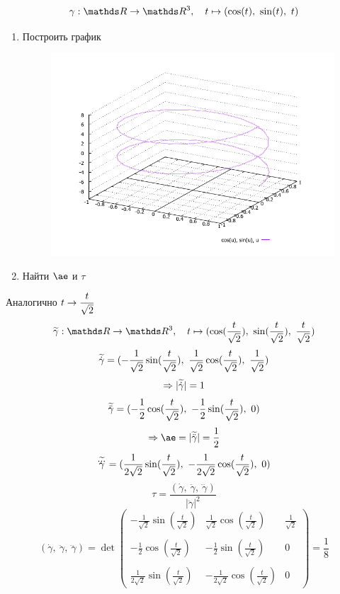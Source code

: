 \documentclass[12pt, fleqn]{article}
\begin{document}
\begin{Example}
  \[\gamma: \R \ra \R^3,\q t \mapsto (\cos(t),\ \sin(t),\ t)\]
  \begin{enumerate}
    \item Построить график
    \begin{figure}[H]
  	    \includegraphics[scale=0.6]{pics/2_3.png}
  	    \centering
  	\end{figure}
    \item Найти $\ae$ и $\tau$
  \end{enumerate}
\end{Example}

\begin{sol}
    Аналогично $t \rightarrow \dfrac{t}{\sqrt{2}}$
    \[\w{\gamma}: \R \ra \R^3,\q t \mapsto (\cos(\frac{t}{\sqrt{2}}),\ \sin(\frac{t}{\sqrt{2}}),\ \frac{t}{\sqrt{2}})\]
    \[\w{\dot{\gamma}}=(-\frac{1}{\sqrt{2}} \sin(\frac{t}{\sqrt{2}}),\ \frac{1}{\sqrt{2}} \cos(\frac{t}{\sqrt{2}}),\ \frac{1}{\sqrt{2}})\]
    \[\Rightarrow |\widetilde{\dot{\gamma}}|=1\]
    \[\w{\ddot{\gamma}}=(-\frac{1}{2} \cos(\frac{t}{\sqrt{2}}),\ -\frac{1}{2} \sin(\frac{t}{\sqrt{2}}),\ 0)\]
    \[\Ra \ae = |\w{\ddot{\gamma}}| = \frac{1}{2}\]
    \[\widetilde{\overset{{}_{\displaystyle ...}}{\gamma}}=(\frac{1}{2 \sqrt{2}} \sin(\frac{t}{\sqrt{2}}),\ -\frac{1}{2 \sqrt{2}} \cos(\frac{t}{\sqrt{2}}),\ 0)\]
    \[\tau = \frac{(\dot{\gamma},\ \ddot{\gamma},\ \dddot{\gamma})}{|\ddot{\gamma}|^2}\]
    \[(\dot{\gamma},\ \ddot{\gamma},\ \dddot{\gamma}) = \det
    \begin{pmatrix}
      -\frac{1}{\sqrt{2}} \sin(\frac{t}{\sqrt{2}}) & \frac{1}{\sqrt{2}} \cos(\frac{t}{\sqrt{2}}) & \frac{1}{\sqrt{2}}\\ \\
      -\frac{1}{2} \cos(\frac{t}{\sqrt{2}}) & -\frac{1}{2} \sin(\frac{t}{\sqrt{2}}) & 0\\ \\
      \frac{1}{2 \sqrt{2}} \sin(\frac{t}{\sqrt{2}}) & -\frac{1}{2 \sqrt{2}} \cos(\frac{t}{\sqrt{2}}) & 0
    \end{pmatrix} = \frac{1}{8}\]
\end{sol}
\end{document}

